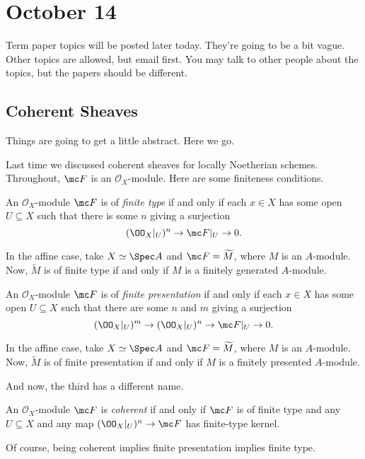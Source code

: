 \documentclass[../notes.tex]{subfiles}
\begin{document}
\section{October 14}

Term paper topics will be posted later today. They're going to be a bit vague. Other topics are allowed, but email first. You may talk to other people about the topics, but the papers should be different.

\subsection{Coherent Sheaves}
Things are going to get a little abstract. Here we go.

Last time we discussed coherent sheaves for locally Noetherian schemes. Throughout, $\mc F$ is an $\mathcal O_X$-module. Here are some finiteness conditions.
\begin{definition}
	An $\mathcal O_X$-module $\mc F$ is of \textit{finite type} if and only if each $x\in X$ has some open $U\subseteq X$ such that there is some $n$ giving a surjection
	\[(\OO_X|_U)^n\to\mc F|_U\to0.\]
\end{definition}
\begin{example}
	In the affine case, take $X\simeq\Spec A$ and $\mc F=\widetilde M$, where $M$ is an $A$-module. Now, $\widetilde M$ is of finite type if and only if $M$ is a finitely generated $A$-module.
\end{example}
\begin{definition}
	An $\mathcal O_X$-module $\mc F$ is of \textit{finite presentation} if and only if each $x\in X$ has some open $U\subseteq X$ such that there are some $n$ and $m$ giving a surjection
	\[(\OO_X|_U)^m\to(\OO_X|_U)^n\to\mc F|_U\to0.\]
\end{definition}
\begin{example}
	In the affine case, take $X\simeq\Spec A$ and $\mc F=\widetilde M$, where $M$ is an $A$-module. Now, $\widetilde M$ is of finite presentation if and only if $M$ is a finitely presented $A$-module.
\end{example}
And now, the third has a different name.
\begin{definition}[Coherent]
	An $\mathcal O_X$-module $\mc F$ is \textit{coherent} if and only if $\mc F$ is of finite type and any $U\subseteq X$ and any map $(\OO_X|_U)^n\to\mc F$ has finite-type kernel.
\end{definition}
Of course, being coherent implies finite presentation implies finite type.
\end{document}
